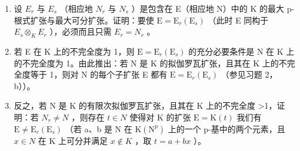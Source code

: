 \begin{enumerate}
\def\labelenumi{\alph{enumi})}
\item
  设 \(E_{r}\) 与 \(E_{s}\) （相应地 \(N_{r}\) 与 \(N_{s}\) ）是包含在 E（相应地 N）中的 K 的最大 p-根式扩张与最大可分扩张。证明：要使 \(\mathrm{E} = \mathrm{E}_{r}(\mathrm{E}_{s})\) （此时 E 同构于 \(E_{s} \otimes_{K} E_{r}\) ），必须而且只需 \(E_{r} = N_{r}\) 。
\item
  若 E 在 K 上的不完全度为 1，则 \(\mathrm{E} = \mathrm{E}_{r}(\mathrm{E}_{s})\) 的充分必要条件是 N 在 K 上的不完全度为 1。由此推出：若 N 是 K 的拟伽罗瓦扩张，且其在 K 上的不完全度等于 1，则对 N 的每个子扩张 E 都有 \(\mathrm{E} = \mathrm{E}_{r}(\mathrm{E}_{s})\) （参见习题 2，b））。
\item
  反之，若 N 是 K 的有限次拟伽罗瓦扩张，且其在 K 上的不完全度 \textgreater1，证明：若 \(N_{r} \neq N\) ，则存在 \(t \in N\) 使得对 K 的扩张 \(\mathrm{E} = \mathrm{K}(t)\) 我们有 \(\mathrm{E} \neq \mathrm{E}_{r}(\mathrm{E}_{s})\) （若 a、b 是 N 在 \(\mathrm{K}(\mathrm{N}^{p})\) 上的一个 p-基中的两个元素，且 \(x \in N\) 在 K 上可分并满足 \(x \notin K\) ，取 \(t = a + bx\) ）。
\end{enumerate}


